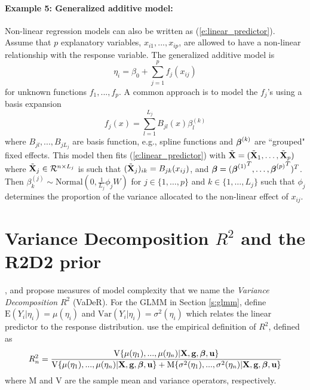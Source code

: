 \documentclass[12pt]{article}
\begin{document}
\paragraph{Example 5: Generalized additive model:} Non-linear regression models can also be written as (\ref{e:linear_predictor}).  Assume that $p$ explanatory variables, $x_{i1},...,x_{ip}$, are allowed to have a non-linear relationship with the response variable. The generalized additive model \citep[e.g.,][]{hastie2017generalized,klein2021bayesian} is $$\eta_i = \beta_0+\sum_{j=1}^p f_j(x_{ij})$$ for unknown functions $f_1,...,f_p$. A common approach is to model the $f_j$'s using a basis expansion
$$
f_j(x) = \sum_{l=1}^{L_j}B_{jl}(x)\beta^{(k)}_{l}
$$
where $B_{jl},...,B_{jL_j}$ are basis function, e.g., spline functions and $\mbox{\boldmath $\beta$}^{(k)}$ are ``grouped" fixed effects.  This model then fits (\ref{e:linear_predictor}) with $\tilde{\mbox{\bf X}}=(\tilde{\mbox{\bf X}}_1,\dots,\tilde {\mbox{\bf X}}_p)$ where $\tilde{\mbox{\bf X}}_j\in\mathcal R^{n\times L_j}$ is such that $(\tilde{\mbox{\bf X}}_j)_{ik}=B_{jk}(x_{ij})$, and $\mbox{\boldmath $\beta$}=({\mbox{\boldmath $\beta$}^{(1)}}^T,\dots,{\mbox{\boldmath $\beta$}^{(p)}}^T)^T$. Then $\beta^{(j)}_k \sim \mbox{Normal}(0, \tfrac1{L_j}\phi_j W)$ for $j\in\{1,\dots,p\}$ and $k\in\{1,\dots,L_j\}$ such that $\phi_j$ determines the proportion of the variance allocated to the non-linear effect of $x_{ij}$.



\section{Variance Decomposition $R^2$ and the R2D2 prior}\label{s:R2_SNR}

\cite{gelmanf2019r}, \cite{gelman2006data} and \cite{zhang2022bayesian} propose measures of model complexity that we name the {\it Variance Decomposition} $R^2$ (VaDeR).  For the GLMM in Section \ref{s:glmm}, define $\mbox{E}(Y_i|\eta_i)=\mu(\eta_i)$ and $\mbox{Var}(Y_i|\eta_i)=\sigma^2(\eta_i)$ which relates the linear predictor to the response distribution. \cite{gelmanf2019r} use the empirical definition of $R^2$, defined as \begin{equation}\label{e:R2_gelman_finite}
   R_n^2 =  \frac{\mbox{V}\{\mu(\eta_1),...,\mu(\eta_n)|\mbox{\bf X},\mbox{\bf g},\mbox{\boldmath $\beta$},\mbox{\bf u}\}}{\mbox{V}\{\mu(\eta_1),...,\mu(\eta_n)|\mbox{\bf X},\mbox{\bf g},\mbox{\boldmath $\beta$},\mbox{\bf u}\}+\mbox{M}\{\sigma^2(\eta_1),...,\sigma^2(\eta_n)|\mbox{\bf X},\mbox{\bf g},\mbox{\boldmath $\beta$},\mbox{\bf u}\}}
\end{equation}
where M and V are the sample mean and variance operators, respectively.
\end{document}
